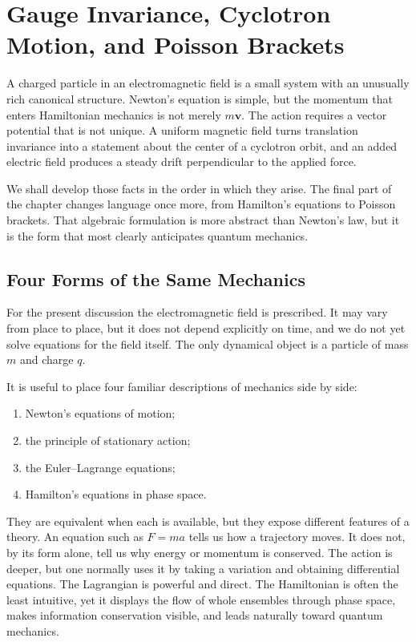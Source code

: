\chapter{Gauge Invariance, Cyclotron Motion, and Poisson Brackets}

A charged particle in an electromagnetic field is a small system with an
unusually rich canonical structure. Newton's equation is simple, but the
momentum that enters Hamiltonian mechanics is not merely \(m\bm v\). The
action requires a vector potential that is not unique. A uniform magnetic
field turns translation invariance into a statement about the center of a
cyclotron orbit, and an added electric field produces a steady drift
perpendicular to the applied force.

We shall develop those facts in the order in which they arise. The final
part of the chapter changes language once more, from Hamilton's equations to
Poisson brackets. That algebraic formulation is more abstract than Newton's
law, but it is the form that most clearly anticipates quantum mechanics.

\section{Four Forms of the Same Mechanics}

For the present discussion the electromagnetic field is prescribed. It may
vary from place to place, but it does not depend explicitly on time, and we
do not yet solve equations for the field itself. The only dynamical object is
a particle of mass \(m\) and charge \(q\).

It is useful to place four familiar descriptions of mechanics side by side:
\begin{enumerate}
\item Newton's equations of motion;
\item the principle of stationary action;
\item the Euler--Lagrange equations;
\item Hamilton's equations in phase space.
\end{enumerate}
They are equivalent when each is available, but they expose different
features of a theory. An equation such as \(F=ma\) tells us how a trajectory
moves. It does not, by its form alone, tell us why energy or momentum is
conserved. The action is deeper, but one normally uses it by taking a
variation and obtaining differential equations. The Lagrangian is powerful
and direct. The Hamiltonian is often the least intuitive, yet it displays the
flow of whole ensembles through phase space, makes information conservation
visible, and leads naturally toward quantum mechanics.

